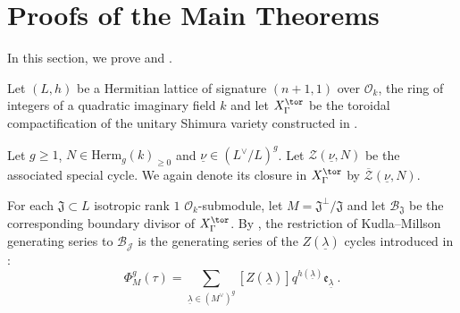 \documentclass[11pt,letterpaper,english]{amsart}
\numberwithin{equation}{subsection}
\numberwithin{equation}{section}
\newcommand\cB{{\mathcal B}}
\newcommand\cJ{{\mathcal J}}
\newcommand\cO{{\mathcal O}}
\newcommand\cZ{{\mathcal Z}}
\newcommand\fJ{{\mathfrak J}}
\newcommand{\trace}{\mathrm{Tr}}
\theoremstyle{plain}
\theoremstyle{remark}
\begin{document}



\section{Proofs of the Main Theorems}\label{s:main-results}

In this section, we prove  and . 
\medskip


Let $(L,h)$ be a Hermitian lattice of signature $(n+1,1)$ over $\cO_k$, the ring of integers of a quadratic imaginary field $k$ and let $X^{\tor}_\Gamma$ be the toroidal compactification of the unitary Shimura variety constructed in . 
\medskip

Let $g\geq 1$, $N\in \mathrm{Herm}_{g}(k)_{\geq 0}$ and $\underline{\nu}\in (L^\vee/L)^g$. Let $\cZ(\underline{\nu},N)$ be the associated special cycle. We again denote its closure in $X^{\tor}_\Gamma$ by $\overline{\cZ}(\underline{\nu},N)$.




\medskip


For each $\fJ\subset L$ isotropic rank $1$ $\cO_k$-submodule, let $M=\fJ^{\bot}/\fJ$ and let $\cB_\fJ$ be the corresponding boundary divisor of $X^{\tor}_\Gamma$. By , the restriction of Kudla--Millson generating series to $\cB_\cJ$ is the generating series of the $Z(\underline{\lambda})$ cycles introduced in :
\[\Phi_M^g(\tau)=\sum_{\underline{\lambda}\in (M^\vee)^g}[Z(\underline{\lambda})]q^{h(\underline \lambda)}\mathfrak e_{\underline\lambda}~.\]
\end{document}
